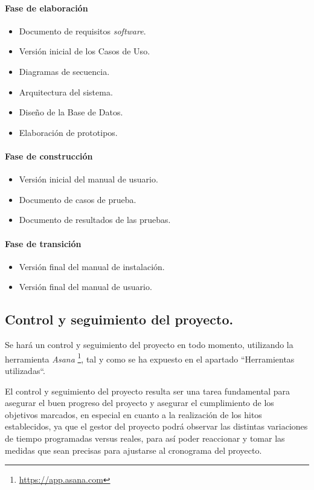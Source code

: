 \documentclass[twoside]{report}
\begin{document}
\paragraph{Fase de elaboración\\}
\begin{itemize}
\item Documento de requisitos \textit{software}.
\item Versión inicial de los Casos de Uso.
\item Diagramas de secuencia.
\item Arquitectura del sistema.
\item Diseño de la Base de Datos.
\item Elaboración de prototipos.
\end{itemize}

\paragraph{Fase de construcción\\}
\begin{itemize}
\item Versión inicial del manual de usuario.
\item Documento de casos de prueba.
\item Documento de resultados de las pruebas.
\end{itemize}

\paragraph{Fase de transición\\}
\begin{itemize}
\item Versión final del manual de instalación.
\item Versión final del manual de usuario.
\end{itemize}

\subsection{Control y seguimiento del proyecto.}

Se hará un control y seguimiento del proyecto en todo momento, utilizando la herramienta \textit{Asana} \footnote{\url{https://app.asana.com}}, tal y como se ha expuesto en el apartado “Herramientas utilizadas“.

El control y seguimiento del proyecto resulta ser una tarea fundamental para asegurar el buen progreso del proyecto y asegurar el cumplimiento de los objetivos marcados, en especial en cuanto a la realización de los hitos establecidos, ya que el gestor del proyecto podrá observar las distintas variaciones de tiempo programadas versus reales, para así poder reaccionar y tomar las medidas que sean precisas para ajustarse al cronograma del proyecto.
\end{document}
